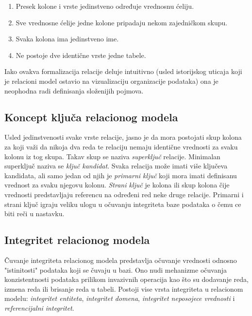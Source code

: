 \documentclass[12pt,oneside]{memoir}
\begin{document}
\begin{enumerate}
\item[\textbullet] Presek kolone i vrste jedinstveno određuje vrednosnu ćeliju.

\item[\textbullet] Sve vrednosne ćelije jedne kolone pripadaju nekom zajedničkom skupu. 

\item[\textbullet] Svaka kolona ima jedinstveno ime.

\item[\textbullet] Ne postoje dve identične vrste jedne tabele. 
\end{enumerate}

Iako ovakva formalizacija relacije deluje intuitivno (usled istorijskog uticaja koji je relacioni model ostavio na vizualizaciju organizacije podataka) ona je neophodna radi definisanja složenijih pojmova. 

\subsection{Koncept ključa relacionog modela}

Usled jedinstvenosti svake vrste relacije, jasno je da mora postojati skup kolona za koji važi da nikoja dva reda te relaciju nemaju identične vrednosti za svaku kolonu iz tog skupa. Takav skup se naziva \textit{superključ} relacije. Minimalan superključ naziva se \textit{ključ kandidat}. Svaka relacija može imati više ključeva kandidata, ali samo jedan od njih je  \textit{primarni ključ} koji mora imati definisanu vrednost za svaku njegovu kolonu.
\textit{Strani ključ} je kolona ili skup kolona čije vrednosti predstavljaju referencu na određeni red neke druge relacije. Primarni i strani ključ igraju veliku ulogu u očuvanju integriteta baze podataka o čemu ce biti reči u nastavku.

\subsection{Integritet relacionog modela}
Čuvanje integriteta relacionog modela predstavlja očuvanje vrednosti odnosno "istinitosti"  podataka koji se čuvaju u bazi. Ono nudi mehanizme očuvanja konzistentnosti podataka prilikom invazivnih operacija kao što su dodavanje reda, izmena reda ili brisanje reda u tabeli. Postoji vise vrsta integriteta u relacionom modelu: \textit{integritet entiteta}, \textit{integritet domena}, \textit{integritet neposojece vrednosti} i \textit{referencijalni integritet}.
\end{document}
